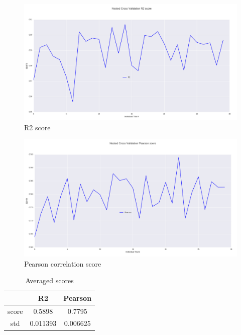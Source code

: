 \documentclass[10pt, a4paper]{article}
\begin{document}
\begin{table}[h!]
\begin{figure}[h!]
\begin{center}
	\centering
	\includegraphics[scale=0.36]{R2.png}
	\caption{R2 score}
\end{center}
\end{figure}


\begin{figure}[h!]
\begin{center}
	\centering
	\includegraphics[scale=0.36]{Pearson.png}
	\caption{Pearson correlation score}
\end{center}
\end{figure}

\begin{table}
\caption{Averaged scores}
\label{tab:narrow-table}
\begin{center}
\begin{tabular}{ccc}
\toprule
& R2 & Pearson\\
\midrule
score & 0.5898 & 0.7795 \\
std & 0.011393 & 0.006625 \\
\bottomrule
\end{tabular}
\end{center}
\end{table}


\end{table}
\end{document}
